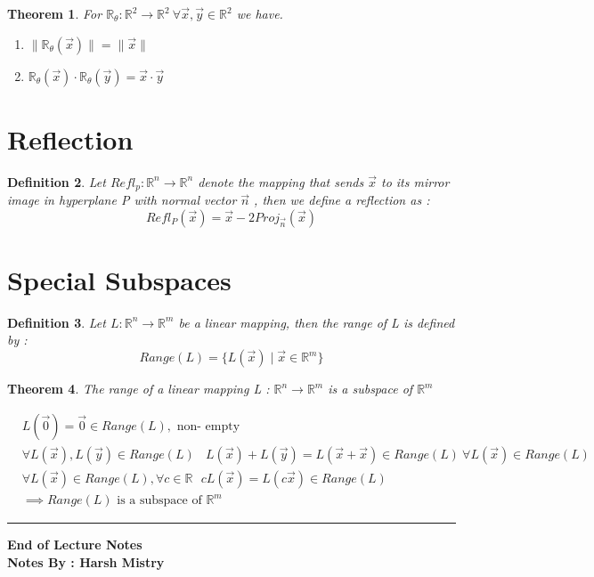 \documentclass{article}
\newcounter{lecnum}
\newtheorem{theorem}{Theorem}[lecnum]
\newtheorem{definition}[theorem]{Definition}
\newenvironment{proof}{{\bf Proof:}}{\hfill\rule{2mm}{2mm}}
\begin{document}
 
 \begin{theorem}
For \( \mathbb{R}_{\theta} : \mathbb{R}^2 \rightarrow \mathbb{R}^2 \ \forall \vec{x} , \vec{y} \in \mathbb{R}^2 \) we have. 
\begin{enumerate}
\item \( \|\mathbb{R}_{\theta} (\vec{x}) \| = \|\vec{x}\| \)
\item \( \mathbb{R}_{\theta} (\vec{x}) \cdot  \mathbb{R}_{\theta} (\vec{y}) = \vec{x} \cdot \vec{y} \)
\end{enumerate}
 \end{theorem}
 
 \section{Reflection}
 \begin{definition}
 Let \( Refl_p : \mathbb{R}^n \rightarrow \mathbb{R}^n\) denote the mapping that sends \(\vec{x} \) to its mirror image in hyperplane P with normal vector \(\vec{n}\) , then we define a reflection as :
 \[Refl_P (\vec{x}) = \vec{x} - 2Proj_{\vec{n}} (\vec{x}) \]
 \end{definition}

 \section{Special Subspaces} 
 
 \begin{definition}
 Let \( L  : \mathbb{R}^n \rightarrow \mathbb{R}^m \) be a linear mapping, then the range of L is defined by : 
 \[Range (L) = \{ L(\vec{x}) \mid \vec{x} \in \mathbb{R}^m \} \]
 \end{definition}
 
  \begin{theorem}
The range of a linear mapping L : \(\mathbb{R}^n \rightarrow \mathbb{R}^m \) is a subspace of \(\mathbb{R}^m\)
 \end{theorem}
 
 \begin{proof}
 \[\begin{aligned} & L(\vec{0}) = \vec{0} \in Range(L) , \text{ non- empty } \\ & \forall L(\vec{x}) , L(\vec{y}) \in Range(L) 
  \ \ \ \ L(\vec{x}) + L(\vec{y}) = L(\vec{x} + \vec{x}) \in Range (L) \ \forall L(\vec{x}) \in Range(L) \\
  & \forall L(\vec{x}) \in Range (L), \forall c \in \mathbb{R} \ \ \ cL(\vec{x}) = L(c\vec{x}) \in Range (L) \\
  & \implies Range(L) \text{ is a subspace of } \mathbb{R}^m\end{aligned} \]
 \end{proof}

\begin{center}
\textbf{End of Lecture Notes} \\
\textbf{Notes By : Harsh Mistry}
\end{center}
\end{document}
